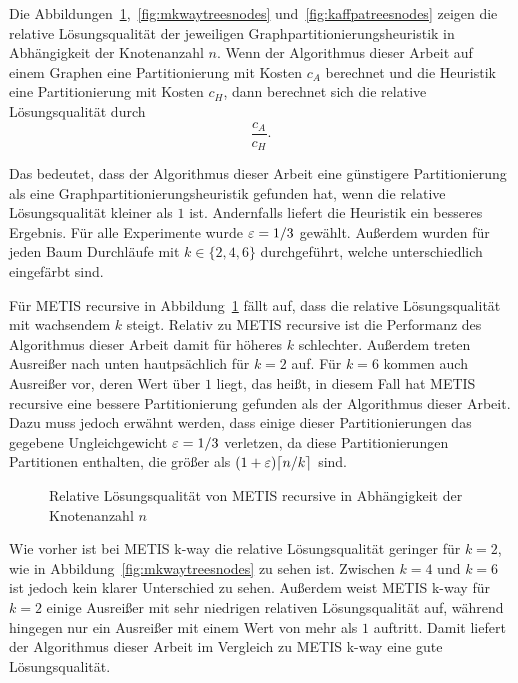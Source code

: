 Die Abbildungen~\ref{fig:mrectreesnodes},~\ref{fig:mkwaytreesnodes} und~\ref{fig:kaffpatreesnodes} zeigen die relative Lösungsqualität der jeweiligen Graphpartitionierungsheuristik in Abhängigkeit der Knotenanzahl $n$.
Wenn der Algorithmus dieser Arbeit auf einem Graphen eine Partitionierung mit Kosten $c_A$ berechnet und die Heuristik eine Partitionierung mit Kosten $c_H$, dann berechnet sich die relative Lösungsqualität durch 
\begin{equation*}
    \frac{c_A}{c_H}. 
\end{equation*}

Das bedeutet, dass der Algorithmus dieser Arbeit eine günstigere Partitionierung als eine Graphpartitionierungsheuristik gefunden hat, wenn die relative Lösungsqualität kleiner als $1$ ist.
Andernfalls liefert die Heuristik ein besseres Ergebnis.
Für alle Experimente wurde $\varepsilon=1/3$ gewählt.
Außerdem wurden für jeden Baum Durchläufe mit $k \in \{2, 4, 6\}$ durchgeführt, welche unterschiedlich eingefärbt sind.

Für METIS recursive in Abbildung~\ref{fig:mrectreesnodes} fällt auf, dass die relative Lösungsqualität mit wachsendem $k$ steigt.
Relativ zu METIS recursive ist die Performanz des Algorithmus dieser Arbeit damit für höheres $k$ schlechter.
Außerdem treten Ausreißer nach unten hautpsächlich für $k=2$ auf.
Für $k=6$ kommen auch Ausreißer vor, deren Wert über $1$ liegt, das heißt, in diesem Fall hat METIS recursive eine bessere Partitionierung gefunden als der Algorithmus dieser Arbeit.
Dazu muss jedoch erwähnt werden, dass einige dieser Partitionierungen das gegebene Ungleichgewicht $\varepsilon=1/3$ verletzen, da diese Partitionierungen Partitionen enthalten, die größer als $(1+\varepsilon) \lceil n/k\rceil$ sind.

\begin{figure}
    \centering
    
    \caption{Relative Lösungsqualität von METIS recursive in Abhängigkeit der Knotenanzahl $n$\label{fig:mrectreesnodes}}
\end{figure}

\pagebreak

Wie vorher ist bei METIS k-way die relative Lösungsqualität geringer für $k=2$, wie in Abbildung~\ref{fig:mkwaytreesnodes} zu sehen ist.
Zwischen $k=4$ und $k=6$ ist jedoch kein klarer Unterschied zu sehen.
Außerdem weist METIS k-way für $k=2$ einige Ausreißer mit sehr niedrigen relativen Lösungsqualität auf, während hingegen nur ein Ausreißer mit einem Wert von mehr als $1$ auftritt.
Damit liefert der Algorithmus dieser Arbeit im Vergleich zu METIS k-way eine gute Lösungsqualität.

